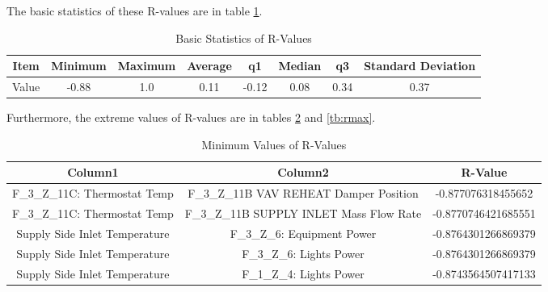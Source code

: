 \documentclass[aps, 10pt, a4paper]{article}
\begin{document}
                The basic statistics of these R-values are in table \ref{tb:rgeneral}.
                
                \begin{table}[htbp]
                    \caption{Basic Statistics of R-Values}
                    \label{tb:rgeneral}
                    \begin{tabular}{c||c|c|c|c|c|c|c}
                        Item & Minimum & Maximum & Average & q1 & Median & q3 & Standard Deviation \\ \hline
                        Value & -0.88 & 1.0 & 0.11 & -0.12 & 0.08 & 0.34 & 0.37 \\
                    \end{tabular}
                \end{table}
            
                Furthermore, the extreme values of R-values are in tables \ref{tb:rmin} and \ref{tb:rmax}.
                
                \begin{table}[htbp]
                    \centering
                    \caption{Minimum Values of R-Values}
                    \label{tb:rmin}
                    \begin{tabular}{c|c||c}
                        Column1 & Column2 & R-Value \\ \hline
                        F\_3\_Z\_11C: Thermostat Temp & F\_3\_Z\_11B VAV REHEAT Damper Position & -0.877076318455652 \\
                        F\_3\_Z\_11C: Thermostat Temp & F\_3\_Z\_11B SUPPLY INLET Mass Flow Rate & -0.8770746421685551 \\
                        Supply Side Inlet Temperature & F\_3\_Z\_6: Equipment Power & -0.8764301266869379 \\
                        Supply Side Inlet Temperature & F\_3\_Z\_6: Lights Power & -0.8764301266869379 \\
                        Supply Side Inlet Temperature & F\_1\_Z\_4: Lights Power & -0.8743564507417133 \\
                    \end{tabular}
                \end{table}
            
\end{document}
